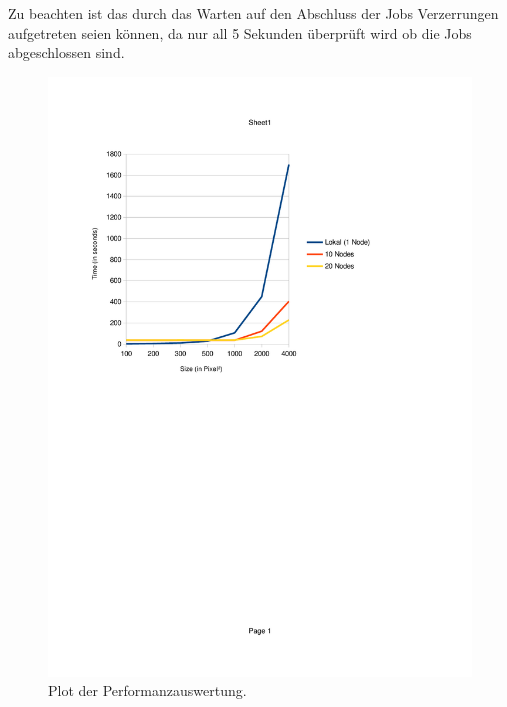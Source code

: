 		Zu beachten ist das durch das Warten auf den Abschluss der Jobs Verzerrungen aufgetreten seien können,
		da nur all 5 Sekunden überprüft wird ob die Jobs abgeschlossen sind.

		\vspace{2cm}
		\begin{figure}[ht!]
			\begin{center}
				\includegraphics[trim=2cm 14cm 4cm 3cm,clip]{./task_03/plot}
			\end{center}
			\caption{Plot der Performanzauswertung.}
			\label{fig:povrayperfplot}
		\end{figure}
		
	
